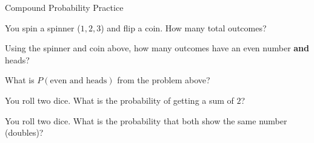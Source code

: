 \newpage
\begin{stepPractice}{Compound Probability Practice}
    \resetProblems

    \prob You spin a spinner ($1, 2, 3$) and flip a coin. How many total outcomes? \answerBlank[2cm]

    \prob Using the spinner and coin above, how many outcomes have an even number \textbf{and} heads? \answerBlank[2cm]

    \prob What is $P(\text{even and heads})$ from the problem above? \answerBlank[2cm]

    \prob You roll two dice. What is the probability of getting a sum of $2$? \answerBlank[2cm]

    \prob You roll two dice. What is the probability that both show the same number (doubles)? \answerBlank[2cm]

\end{stepPractice}

